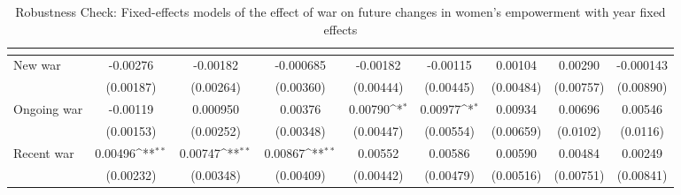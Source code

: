 \begin{table}[htbp]\centering
\def\sym#1{\ifmmode^{#1}\else\(^{#1}\)\fi}
\caption{Robustness Check: Fixed-effects models of the effect of war on future changes in women's empowerment with year fixed effects\label{polemprobustyear}}
\begin{tabular}{l*{8}{c}}
\hline\hline
                    &&&&&&&&\\
\hline
New war             &    -0.00276         &    -0.00182         &   -0.000685         &    -0.00182         &    -0.00115         &     0.00104         &     0.00290         &   -0.000143         \\
                    &   (0.00187)         &   (0.00264)         &   (0.00360)         &   (0.00444)         &   (0.00445)         &   (0.00484)         &   (0.00757)         &   (0.00890)         \\
[1em]
Ongoing war          &    -0.00119         &    0.000950         &     0.00376         &     0.00790\sym{*}  &     0.00977\sym{*}  &     0.00934         &     0.00696         &     0.00546         \\
                    &   (0.00153)         &   (0.00252)         &   (0.00348)         &   (0.00447)         &   (0.00554)         &   (0.00659)         &    (0.0102)         &    (0.0116)         \\
[1em]
Recent war             &     0.00496\sym{**} &     0.00747\sym{**} &     0.00867\sym{**} &     0.00552         &     0.00586         &     0.00590         &     0.00484         &     0.00249         \\
                    &   (0.00232)         &   (0.00348)         &   (0.00409)         &   (0.00442)         &   (0.00479)         &   (0.00516)         &   (0.00751)         &   (0.00841)         \\

\end{tabular}
\end{table}
